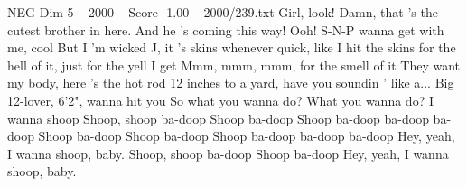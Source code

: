 \begin{textsample}{NEG Dim 5 – 2000 – Score -1.00 – 2000/239.txt}
Girl, look!
Damn, that 's the cutest brother in here.
And he 's coming this way!
Ooh!
S-N-P wanna get with me, cool But I 'm wicked J, it 's skins whenever quick, like I hit the skins for the hell of it, just for the yell I get Mmm, mmm, mmm, for the smell of it They want my body, here 's the hot rod 12 inches to a yard, have you soundin ' like a...
Big 12-lover, 6'2", wanna hit you So what you wanna do?
What you wanna do?
I wanna shoop Shoop, shoop ba-doop Shoop ba-doop Shoop ba-doop ba-doop ba-doop Shoop ba-doop Shoop ba-doop Shoop ba-doop ba-doop ba-doop Hey, yeah, I wanna shoop, baby.
Shoop, shoop ba-doop Shoop ba-doop Hey, yeah, I wanna shoop, baby.

\end{textsample}
